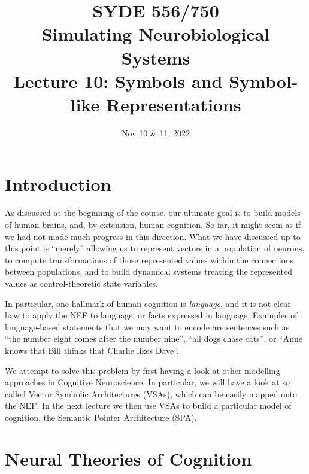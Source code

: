 \documentclass[10pt,letterpaper,oneside]{article}
\date{Nov 10 \& 11, 2022}
\title{SYDE 556/750 \\ Simulating Neurobiological Systems \\ Lecture 10: Symbols and Symbol-like Representations}
\begin{document}

\section{Introduction}


As discussed at the beginning of the course, our ultimate goal is to build models of human brains, and, by extension, human cognition. So far, it might seem as if we had not made much progress in this direction. What we have discussed up to this point is \enquote{merely} allowing us to represent vectors in a population of neurons, to compute transformations of those represented values within the connections between populations, and to build dynamical systems treating the represented values as control-theoretic state variables.

In particular, one hallmark of human cognition is \emph{language}, and it is not clear how to apply the NEF to language, or facts expressed in language. Examples of language-based statements that we may want to encode are sentences such as \enquote{the number eight comes after the number nine}, \enquote{all dogs chase cats}, or \enquote{Anne knows that Bill thinks that Charlie likes Dave}.

We attempt to solve this problem by first having a look at other modelling approaches in Cognitive Neuroscience. In particular, we will have a look at so called Vector Symbolic Architectures (VSAs), which can be easily mapped onto the NEF. In the next lecture we then use VSAs to build a particular model of cognition, the Semantic Pointer Architecture (SPA).

\section{Neural Theories of Cognition}

\end{document}
